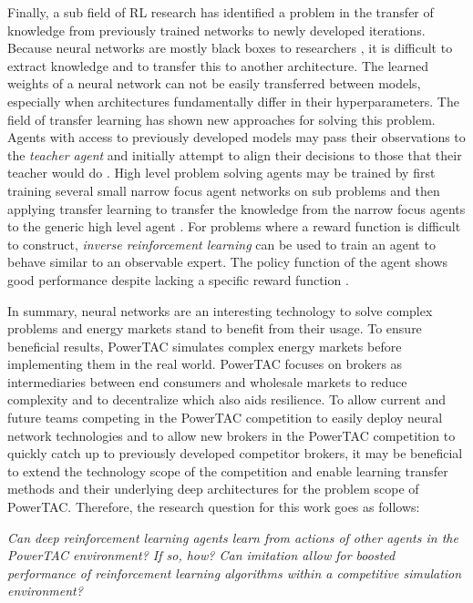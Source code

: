 Finally, a sub field of \ac{RL} research has identified a problem in the transfer of knowledge from previously trained
networks to newly developed iterations. Because neural networks are mostly black boxes to researchers
\citep{yosinski2015understanding}, it is difficult to extract knowledge and to transfer this to another architecture. The
learned weights of a neural network can not be easily transferred between models, especially when architectures fundamentally
differ in their hyperparameters. The field of transfer learning has shown new approaches for solving this problem.
Agents with access to previously developed models may pass their observations to the \emph{teacher agent} and initially
attempt to align their decisions to those that their teacher would do \citep{schmitt2018kickstarting}. High level
problem solving agents may be trained by first training several small narrow focus agent networks on sub problems and
then applying transfer learning to transfer the knowledge from the narrow focus agents to the generic high level
agent \citep{parisotto2015actor}. For problems where a reward function is difficult to construct, \emph{inverse
reinforcement learning} can be used to train an agent to behave similar to an observable expert. The policy function of
the agent shows good performance despite lacking a specific reward function \citep{NG2004Apprentice}.

In summary, neural networks are an interesting technology to solve complex problems and energy markets stand to benefit from
their usage. To ensure beneficial results, \ac{PowerTAC} simulates complex energy markets before implementing them in the real
world. \ac{PowerTAC} focuses on brokers as intermediaries between end consumers and wholesale markets to reduce
complexity and to decentralize which also aids resilience. To allow current and future teams competing in the \ac{PowerTAC}
competition to easily deploy neural network technologies and to allow new brokers in the \ac{PowerTAC} competition to quickly
catch up to previously developed competitor brokers, it may be beneficial to extend the technology scope of the
competition and enable learning transfer methods and their underlying deep architectures for the problem scope of
\ac{PowerTAC}. Therefore, the research question for this work goes as follows:

\emph{Can deep reinforcement learning agents learn from actions of other agents in the \ac{PowerTAC} environment? If so,
    how? Can imitation allow for boosted performance of reinforcement learning algorithms within a competitive simulation
environment?}



